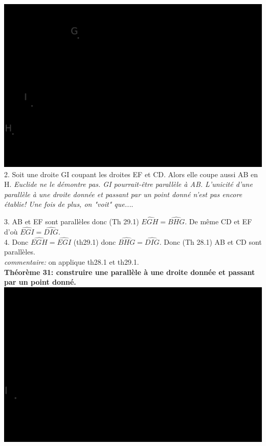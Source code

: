 \documentclass[a4paper, 12pt, twoside]{book}
\begin{document}
\includegraphics[scale=0.2]{figures/th30.eps}\\


2. Soit une droite GI coupant les droites EF et CD. Alors elle coupe aussi AB en H. \textit{Euclide ne le démontre pas. GI pourrait-être parallèle à AB. L'unicité d'une parallèle à une droite donnée et passant par un point donné n'est pas encore établie! Une fois de plus, on "voit" que...}.\





 3. AB et EF sont parallèles donc (Th 29.1) $\hat{EGH}= \hat{BHG}$. De même CD et EF d'où  $\hat{EGI}= \hat{DIG}$.\\
 4. Donc $\hat{EGH}= \hat{EGI}$ (th29.1) donc $\hat{BHG}= \hat{DIG}$. Donc (Th 28.1) AB et CD sont parallèles.\\
 
 
 \textit{commentaire:} on applique th28.1 et th29.1.\\
 
  \textbf{Théorème 31: construire une parallèle à une droite donnée et passant par un point donné.}\\
 
 
 \includegraphics[scale=0.2]{figures/th31.eps} \\ 
 
\end{document}
